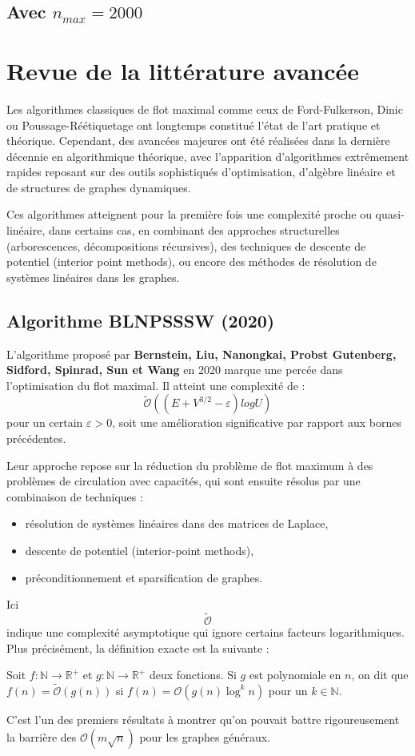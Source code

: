\documentclass[a4paper]{article}
\begin{document}
\subsection{Avec $n_{max} = 2000$}

\section{Revue de la littérature avancée}

Les algorithmes classiques de flot maximal comme ceux de Ford-Fulkerson, Dinic ou Poussage-Réétiquetage ont longtemps constitué l’état de l’art pratique et théorique. Cependant, des avancées majeures ont été réalisées dans la dernière décennie en algorithmique théorique, avec l’apparition d’algorithmes extrêmement rapides reposant sur des outils sophistiqués d’optimisation, d’algèbre linéaire et de structures de graphes dynamiques.

Ces algorithmes atteignent pour la première fois une complexité proche ou quasi-linéaire, dans certains cas, en combinant des approches structurelles (arborescences, décompositions récursives), des techniques de descente de potentiel (interior point methods), ou encore des méthodes de résolution de systèmes linéaires dans les graphes.

\subsection{Algorithme BLNPSSSW (2020)}

L’algorithme proposé par \textbf{Bernstein, Liu, Nanongkai, Probst Gutenberg, Sidford, Spinrad, Sun et Wang} en 2020 marque une percée dans l’optimisation du flot maximal\cite{chen2022maximumflowminimumcostflow}. Il atteint une complexité de :
\[
\tilde{\mathcal{O}}((E+ V^{3/2} - \varepsilon)log U)
\]
pour un certain $\varepsilon > 0$, soit une amélioration significative par rapport aux bornes précédentes.

Leur approche repose sur la réduction du problème de flot maximum à des problèmes de circulation avec capacités, qui sont ensuite résolus par une combinaison de techniques :
\begin{itemize}
    \item résolution de systèmes linéaires dans des matrices de Laplace,
    \item descente de potentiel (interior-point methods),
    \item préconditionnement et sparsification de graphes.
\end{itemize}
Ici \[\tilde{\mathcal{O}}\] indique une complexité asymptotique qui ignore certains facteurs logarithmiques. Plus précisément, la définition exacte est la suivante :
\begin{definition} Soit $f: \mathbb{N} \to \mathbb{R}^+$ et $g: \mathbb{N} \to \mathbb{R}^+$ deux fonctions. Si $g$ est polynomiale en $n$, on dit que
	$f(n) = \tilde{\mathcal{O}}(g(n))$ si  $f(n) = \mathcal{O}(g(n) \log^k n)$ pour un $k \in \mathbb{N}$.
\end{definition}
C’est l’un des premiers résultats à montrer qu’on pouvait battre rigoureusement la barrière des $\mathcal{O}(m \sqrt{n})$ pour les graphes généraux.
\end{document}
